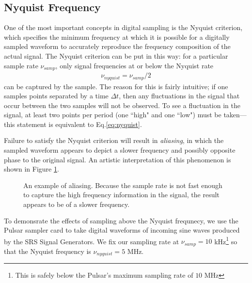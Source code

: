 \documentclass[12pt]{article}
\begin{document}
\subsection{Nyquist Frequency}
One of the most important concepts in digital sampling is the Nyquist criterion, which specifies the minimum frequency at which it is possible for a digitally sampled waveform to accurately reproduce the frequency composition of the actual signal. The Nyquist criterion can be put in this way: for a particular sample rate $\nu_{samp}$, only signal frequencies at or below the Nyquist rate
\begin{eqnarray}
 \nu_{nyquist} = \nu_{samp} / 2 \label{eq:nyquist}
\end{eqnarray}
can be captured by the sample. The reason for this is fairly intuitive; if one samples points separated by a time $\Delta{t}$, then any fluctuations in the signal that occur between the two samples will not be observed. To see a fluctuation in the signal, at least two points per period (one ``high" and one ``low") must be taken---this statement is equivalent to Eq.\ref{eq:nyquist}.

Failure to satisfy the Nyquist criterion will result in \textit{aliasing}, in which the sampled waveform appears to depict a slower frequency and possibly opposite phase to the original signal. An artistic interpretation of this phenomenon is shown in Figure \ref{fig:aliasing}.
\begin{figure}[H]
\caption[SODUMB]{An example of aliasing. Because the sample rate is not fast enough to capture the high frequency information in the signal, the result appears to be of a slower frequency.}
\label{fig:aliasing}
\end{figure}

To demonsrate the effects of sampling above the Nyquist frequnecy, we use the Pulsar sampler card to take digital waveforms of incoming sine waves produced by the SRS Signal Generators. We fix our sampling rate at $\nu_{samp} = 10$ kHz\footnote{This is safely below the Pulsar's maximum sampling rate of $10$ MHz} so that the Nyquist frequency is $\nu_{nyquist} = 5$ MHz.
\end{document}
